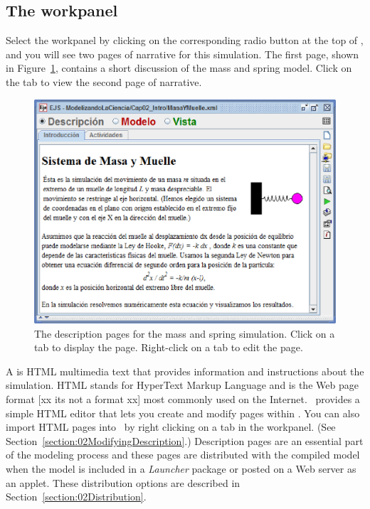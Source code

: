 
\subsection{The  workpanel}

Select the  workpanel by clicking on the corresponding radio button at the top of
\ejs, and you will see two pages of narrative for this simulation. The first page, shown in
Figure~\ref{fig:02EjsIntro/SpringDesc}, contains a short discussion of the mass and spring model. Click on the
 tab to view the second page of narrative.

\begin{figure}[htb]
  \centering
  \includegraphics[scale=\scale]{02EjsIntro/images/SpringDesc.eps}
  \caption{The description pages for the mass and spring simulation. Click on a tab to display the page. Right-click on a tab to edit the page.}
  \label{fig:02EjsIntro/SpringDesc}
\end{figure}

A  is HTML multimedia text that provides information and instructions about the
simulation. HTML stands for HyperText Markup Language and is the Web page format [xx its not a format xx] most commonly used on the
Internet.  \ejs\ provides a simple HTML editor that lets you create and modify pages within \ejs.  You can also
import HTML pages into \ejs\ by right clicking on a tab in the  workpanel. (See
Section~\ref{section:02ModifyingDescription}.) Description pages are an essential part of the modeling process and
these pages are distributed with the compiled model when the model is included in a \emph{Launcher} package
or posted on a Web server as an applet. These distribution options are described in
Section~\ref{section:02Distribution}.

